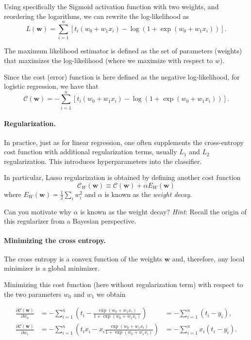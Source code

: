 \documentclass[%
oneside,                 %
final,                   %
10pt]{article}
\newenvironment{question_mdfboxadmon}[1][]{
\begin{question_mdfboxmdframed}[frametitle=#1]
}
{
\end{question_mdfboxmdframed}
}
\begin{document}
Using specifically the Sigmoid activation function with two weights, and reordering the logarithms, we can rewrite the log-likelihood as
\[
L(\boldsymbol{w}) = \sum_{i=1}^n  \left[ t_i(w_0+w_1 x_i) -\log{(1+\exp{(w_0+w_1x_i)})} \right].
\]

The maximum likelihood estimator is defined as the set of parameters (weights) that maximizes the log-likelihood (where we maximize with respect to $w$).

Since the cost (error) function is here defined as the negative log-likelihood, for logistic regression, we have that
\[
\mathcal{C}(\boldsymbol{w})=-\sum_{i=1}^n  \left[ t_i (w_0+w_1x_i) -\log{ \left( 1+\exp{(w_0+w_1x_i)} \right) } \right].
\]

\paragraph{Regularization.}
In practice, just as for linear regression, one often supplements the cross-entropy cost function with additional regularization terms, usually $L_1$ and $L_2$ regularization. This introduces hyperparameters into the classifier.

In particular, Lasso regularization is obtained by defining another cost function
\[
\mathcal{C}_W (\boldsymbol{w}) \equiv \mathcal{C} (\boldsymbol{w}) + \alpha E_W (\boldsymbol{w})
\]
where $E_W (\boldsymbol{w}) = \frac{1}{2} \sum_i w_i^2$ and $\alpha$ is known as the \emph{weight decay}.


\begin{question_mdfboxadmon}[Question]
Can you motivate why $\alpha$ is known as the weight decay? \emph{Hint}: Recall the origin of this regularizer from a Bayesian perspective.
\end{question_mdfboxadmon} %




\paragraph{Minimizing the cross entropy.}
The cross entropy is a convex function of the weights $\boldsymbol{w}$ and,
therefore, any local minimizer is a global minimizer. 


Minimizing this cost function (here without regularization term) with respect to the two parameters $w_0$ and $w_1$ we obtain

\begin{align*}
\frac{\partial \mathcal{C}(\boldsymbol{w})}{\partial w_0} 
&= -\sum_{i=1}^n  \left(t_i -\frac{\exp{(w_0+w_1x_i)}}{1+\exp{(w_0+w_1x_i)}}\right)
&= -\sum_{i=1}^n  \left(t_i - y_i \right), \\
\frac{\partial \mathcal{C}(\boldsymbol{w})}{\partial w_1} 
&= -\sum_{i=1}^n  \left(t_i x_i -x_i\frac{\exp{(w_0+w_1x_i)}}{1+\exp{(w_0+w_1x_i)}}\right)
&= -\sum_{i=1}^n  x_i \left(t_i - y_i \right).
\end{align*}
\end{document}
